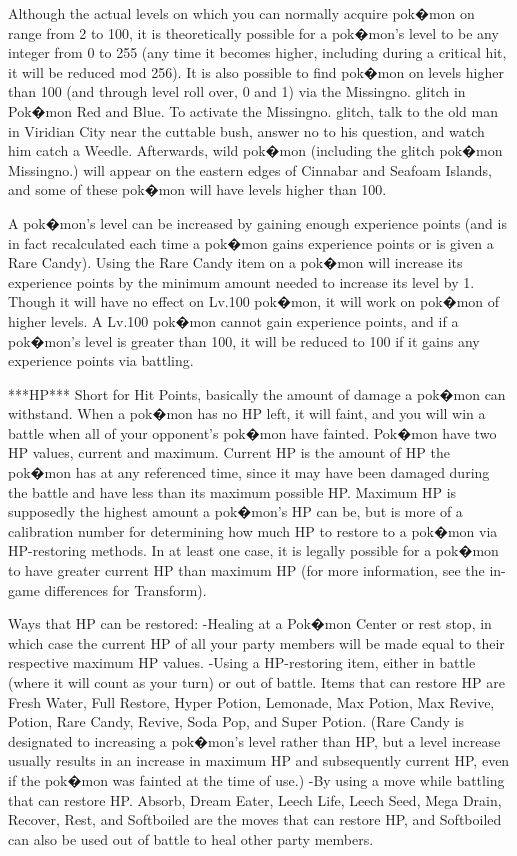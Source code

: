 \documentclass[reprint, aps, prl, paper=A4]{revtex4-1}
\begin{document}
Although the actual levels on which you can normally acquire pok�mon on range from 2 to 100, it
is theoretically possible for a pok�mon's level to be any integer from 0 to 255 (any time it
becomes higher, including during a critical hit, it will be reduced mod 256). It is also
possible to find pok�mon on levels higher than 100 (and through level roll over, 0 and 1) via
the Missingno. glitch in Pok�mon Red and Blue. To activate the Missingno. glitch, talk to the
old man in Viridian City near the cuttable bush, answer no to his question, and watch him catch
a Weedle. Afterwards, wild pok�mon (including the glitch pok�mon Missingno.) will appear on the
eastern edges of Cinnabar and Seafoam Islands, and some of these pok�mon will have levels
higher than 100.

A pok�mon's level can be increased by gaining enough experience points (and is in fact
recalculated each time a pok�mon gains experience points or is given a Rare Candy). Using the
Rare Candy item on a pok�mon will increase its experience points by the minimum amount needed
to increase its level by 1. Though it will have no effect on Lv.100 pok�mon, it will work on
pok�mon of higher levels. A Lv.100 pok�mon cannot gain experience points, and if a pok�mon's
level is greater than 100, it will be reduced to 100 if it gains any experience points via
battling.


***HP***
Short for Hit Points, basically the amount of damage a pok�mon can withstand. When a pok�mon
has no HP left, it will faint, and you will win a battle when all of your opponent's pok�mon
have fainted. Pok�mon have two HP values, current and maximum. Current HP is the amount of HP
the pok�mon has at any referenced time, since it may have been damaged during the battle and
have less than its maximum possible HP. Maximum HP is supposedly the highest amount a pok�mon's
HP can be, but is more of a calibration number for determining how much HP to restore to a
pok�mon via HP-restoring methods. In at least one case, it is legally possible for a pok�mon to
have greater current HP than maximum HP (for more information, see the in-game differences for
Transform).

Ways that HP can be restored:
     -Healing at a Pok�mon Center or rest stop, in which case the current HP of all your party
      members will be made equal to their respective maximum HP values.
     -Using a HP-restoring item, either in battle (where it will count as your turn) or out of
      battle. Items that can restore HP are Fresh Water, Full Restore, Hyper Potion, Lemonade,
      Max Potion, Max Revive, Potion, Rare Candy, Revive, Soda Pop, and Super Potion. (Rare
      Candy is designated to increasing a pok�mon's level rather than HP, but a level increase
      usually results in an increase in maximum HP and subsequently current HP, even if the
      pok�mon was fainted at the time of use.)
     -By using a move while battling that can restore HP. Absorb, Dream Eater, Leech Life,
      Leech Seed, Mega Drain, Recover, Rest, and Softboiled are the moves that can restore HP,
      and Softboiled can also be used out of battle to heal other party members.
\end{document}
